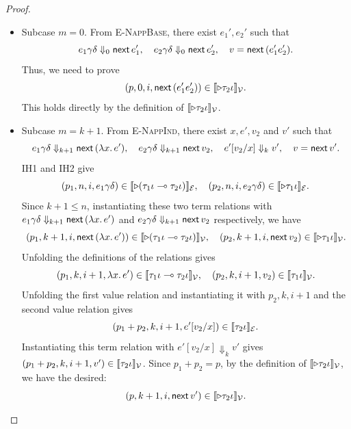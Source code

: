 \begin{proof}
\begin{itemize}
\begin{itemize}
\item {Subcase $m=0$.}
From \textsc{E-NappBase}, there exist $e_1', e_2'$ such that
\[
  e_1\gamma\delta \Downarrow_0 \mathsf{next}\, e_1', \quad
  e_2\gamma\delta \Downarrow_0 \mathsf{next}\, e_2', \quad
  v = \mathsf{next}\,(e_1'e_2').
\]
Thus, we need to prove
\[(p, 0, i, \mathsf{next}\,(e_1'e_2')) \in \llbracket \triangleright\tau_2\iota \rrbracket_{\mathcal{V}}.\]
This holds directly by the definition of $\llbracket \triangleright\tau_2\iota \rrbracket_{\mathcal{V}}$.

\item {Subcase $m=k+1$.}
From \textsc{E-NappInd}, there exist $x, e', v_2$ and $v'$ such that
\[
  e_1\gamma\delta \Downarrow_{k+1}\mathsf{next}\,(\lambda x.\,e'), \quad
  e_2\gamma\delta \Downarrow_{k+1}\mathsf{next}\, v_2, \quad
  e'[v_2/x] \Downarrow_k v',\quad v =\mathsf{next}\, v'.
\]
IH1 and IH2 give
\[
  (p_1, n, i, e_1\gamma\delta)\in\llbracket \triangleright(\tau_1\iota\multimap\tau_2\iota) \rrbracket_{\mathcal{E}},
  \quad
  (p_2, n, i, e_2\gamma\delta)\in\llbracket \triangleright\tau_1\iota \rrbracket_{\mathcal{E}}.
\]
Since $k+1 \leq n$, instantiating these two term relations with $e_1\gamma\delta \Downarrow_{k+1}\mathsf{next}\,(\lambda x.\,e')$
and $e_2\gamma\delta \Downarrow_{k+1}\mathsf{next}\, v_2$ respectively, we have
\[
  (p_1, k+1, i, \mathsf{next}\,(\lambda x.\,e'))\in\llbracket \triangleright(\tau_1\iota\multimap\tau_2\iota) \rrbracket_{\mathcal{V}},
  \quad
  (p_2, k+1, i, \mathsf{next}\, v_2)\in\llbracket \triangleright\tau_1\iota \rrbracket_{\mathcal{V}}.
\]
Unfolding the definitions of the relations gives
\[
  (p_1, k, i+1, \lambda x.\,e')\in\llbracket \tau_1\iota\multimap\tau_2\iota \rrbracket_{\mathcal{V}},
  \quad
  (p_2, k, i+1, v_2)\in\llbracket \tau_1\iota \rrbracket_{\mathcal{V}}.
\]
Unfolding the first value relation and instantiating it with $p_2, k, i+1$ and the second value relation gives
\[(p_1+p_2, k, i+1, e'[v_2/x])\in\llbracket \tau_2\iota \rrbracket_{\mathcal{E}}.\]
Instantiating this term relation with $e'[v_2/x]\Downarrow_k v'$
gives $(p_1+p_2, k, i+1, v')\in\llbracket \tau_2\iota \rrbracket_{\mathcal{V}}$. Since $p_1+p_2 = p$, by the definition of
$\llbracket \triangleright\tau_2\iota \rrbracket_{\mathcal{V}}$, we have the desired:
\[(p, k+1, i, \mathsf{next}\, v')\in\llbracket \triangleright\tau_2\iota \rrbracket_{\mathcal{V}}.\]
\end{itemize}


\end{itemize}
\end{proof}

